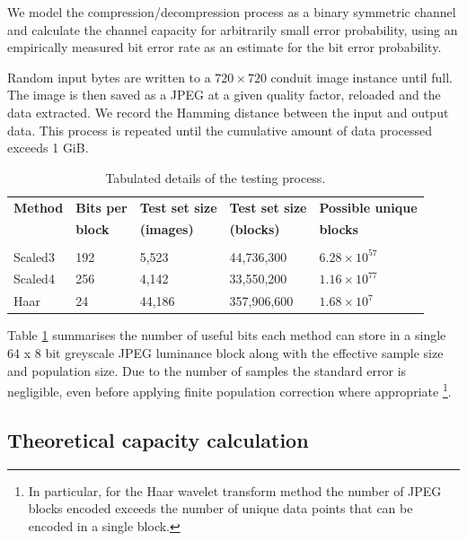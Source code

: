 We model the compression/decompression process as a binary symmetric channel and calculate the channel capacity for arbitrarily small error probability, using an empirically measured bit error rate as an estimate for the bit error probability.

Random input bytes are written to a $720 \times 720$ conduit image instance until full. The image is then saved as a JPEG at a given quality factor, reloaded and the data extracted. We record the Hamming distance between the input and output data. This process is repeated until the cumulative amount of data processed exceeds 1 GiB.

\begin{table}[tbph]
  \begin{center}
        \begin{tabular}{l l l l l}
        \textbf{Method} &\textbf{Bits per} &\textbf{Test set size} & \textbf{Test set size} &\textbf{Possible unique} \\ 
            &\textbf{block} &\textbf{(images)} &\textbf{(blocks)} &\textbf{blocks} \\ [0.1ex] \hline \\ [-1.5ex]
        Scaled3	&192	&5,523	&44,736,300	& $6.28 \times 10^{57}$ \\
        Scaled4	&256	&4,142	&33,550,200	& $1.16 \times 10^{77}$ \\
        Haar	&24	&44,186	&357,906,600	& $1.68 \times 10^{7}$ \\
        \end{tabular}
        \caption{Tabulated details of the testing process.}
        \label{tab:img-test}
    \end{center}
\end{table}

Table \ref{tab:img-test} summarises the number of useful bits each method can store in a single 64 x 8 bit greyscale JPEG luminance block along with the effective sample size and population size. Due to the number of samples the standard error is negligible, even before applying finite population correction where appropriate \footnote{In particular, for the Haar wavelet transform method the number of JPEG blocks encoded exceeds the number of unique data points that can be encoded in a single block.}. 

\subsection{Theoretical capacity calculation}

